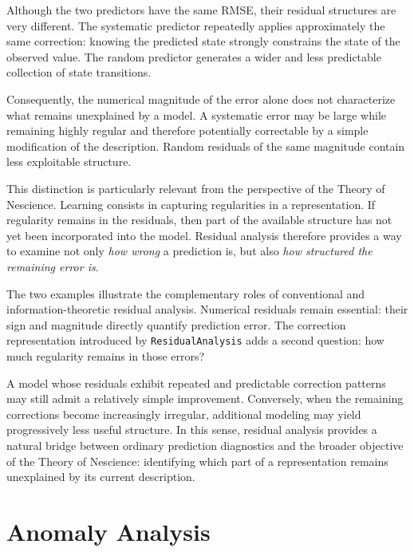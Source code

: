\begin{example}
Although the two predictors have the same RMSE, their residual structures are
very different. The systematic predictor repeatedly applies approximately the
same correction: knowing the predicted state strongly constrains the state of
the observed value. The random predictor generates a wider and less predictable
collection of state transitions.

Consequently, the numerical magnitude of the error alone does not characterize
what remains unexplained by a model. A systematic error may be large while
remaining highly regular and therefore potentially correctable by a simple
modification of the description. Random residuals of the same magnitude contain
less exploitable structure.

This distinction is particularly relevant from the perspective of the Theory of
Nescience. Learning consists in capturing regularities in a representation. If
regularity remains in the residuals, then part of the available structure has not
yet been incorporated into the model. Residual analysis therefore provides a
way to examine not only \emph{how wrong} a prediction is, but also
\emph{how structured the remaining error is}.
\end{example}

The two examples illustrate the complementary roles of conventional and
information-theoretic residual analysis. Numerical residuals remain essential:
their sign and magnitude directly quantify prediction error. The correction
representation introduced by \texttt{ResidualAnalysis} adds a second question:
how much regularity remains in those errors?

A model whose residuals exhibit repeated and predictable correction patterns
may still admit a relatively simple improvement. Conversely, when the remaining
corrections become increasingly irregular, additional modeling may yield
progressively less useful structure. In this sense, residual analysis provides a
natural bridge between ordinary prediction diagnostics and the broader objective
of the Theory of Nescience: identifying which part of a representation remains
unexplained by its current description.


%
%

\section{Anomaly Analysis}
\label{sec:machine_learning_anomalies}

